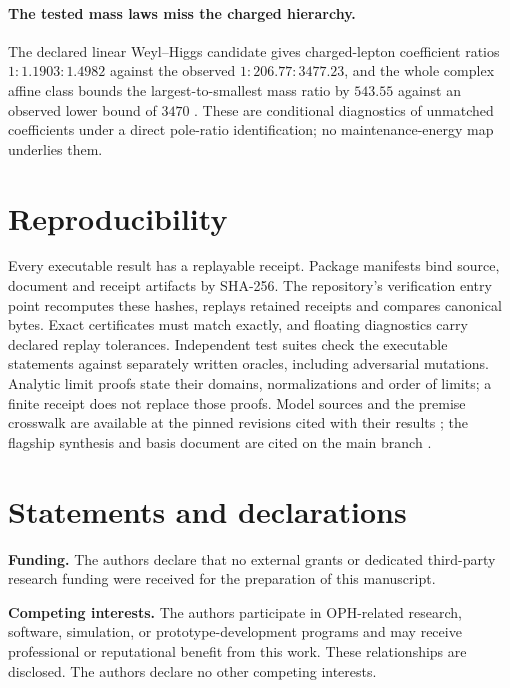 \documentclass[11pt]{article}
\theoremstyle{definition}
\theoremstyle{remark}
\theoremstyle{plain}
\begin{document}
\paragraph{The tested mass laws miss the charged hierarchy.} The declared
linear Weyl--Higgs candidate gives charged-lepton coefficient ratios
$1:1.1903:1.4982$ against the observed $1:206.77:3477.23$, and the whole
complex affine class bounds the largest-to-smallest mass ratio by $543.55$
against an observed lower bound of $3470$
\cite{physicalAudit,massResponse}. These are conditional diagnostics of
unmatched coefficients under a direct pole-ratio identification; no
maintenance-energy map underlies them.

\section{Reproducibility}
\label{sec:repro}

Every executable result has a replayable receipt. Package manifests bind
source, document and receipt artifacts by SHA-256. The repository's
verification entry point recomputes these hashes, replays retained receipts
and compares canonical bytes. Exact certificates must match exactly, and
floating diagnostics carry declared replay tolerances. Independent test
suites check the executable statements against separately written oracles,
including adversarial mutations. Analytic limit proofs state their domains,
normalizations and order of limits; a finite receipt does not replace those
proofs. Model sources and the premise crosswalk are available at the pinned
revisions cited with their results \cite{nativeContinuum,mPREMISES}; the
flagship synthesis and basis document are cited on the main branch
\cite{flagship,basis}.

\section*{Statements and declarations}

\noindent\textbf{Funding.}
The authors declare that no external grants or dedicated third-party research
funding were received for the preparation of this manuscript.

\noindent\textbf{Competing interests.}
The authors participate in OPH-related research, software, simulation, or
prototype-development programs and may receive professional or reputational
benefit from this work. These relationships are disclosed. The authors declare
no other competing interests.
\end{document}
